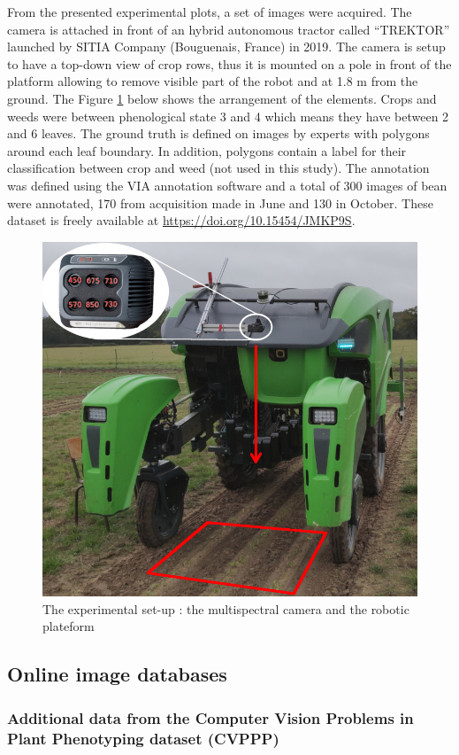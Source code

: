\documentclass[../thesis.tex]{subfiles}
\begin{document}
    From the presented experimental plots, a set of images were acquired. The camera is attached in front of an hybrid autonomous tractor called “TREKTOR” launched by SITIA Company (Bouguenais, France) in 2019. The camera is setup to have a top-down view of crop rows, thus it is mounted on a pole in front of the platform allowing to remove visible part of the robot and at 1.8 m from the ground. The Figure \ref{fig:07-trecktor} below shows the arrangement of the elements. Crops and weeds were between phenological state 3 and 4 which means they have between 2 and 6 leaves. The ground truth is defined on images by experts with polygons around each leaf boundary. In addition, polygons contain a label for their classification between crop and weed (not used in this study). The annotation was defined using the VIA annotation software \cite{dutta2019vgg} and a total of 300 images of bean were annotated, 170 from acquisition made in June and 130 in October. These dataset is freely available at \url{https://doi.org/10.15454/JMKP9S}.
    
    \begin{figure}[H]
        \centering
        \includegraphics[width=0.5\linewidth]{img/leaf/trektor}
        \caption{The experimental set-up : the multispectral camera and the robotic plateform}
        \label{fig:07-trecktor}
    \end{figure}
    
    \subsection{Online image databases}
    \label{sec:online-dataset}
    
    \subsubsection{Additional data from the Computer Vision Problems in Plant Phenotyping dataset (CVPPP)}
    \label{sec:cvppp-dataset}
    
\end{document}
